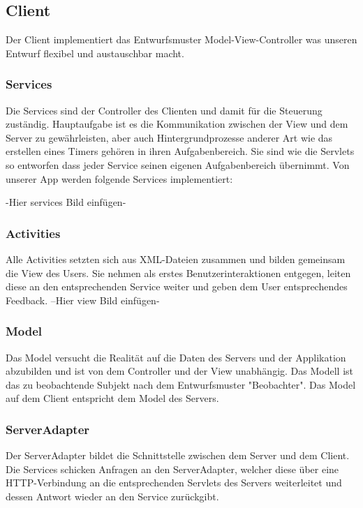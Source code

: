 	\subsection{Client}
	Der Client implementiert das Entwurfsmuster Model-View-Controller was unseren Entwurf flexibel und austauschbar macht.
	\subsubsection{Services}
	Die Services sind der Controller des Clienten und damit für die Steuerung zuständig. Hauptaufgabe ist es die Kommunikation zwischen der View und dem Server zu gewährleisten, aber auch Hintergrundprozesse anderer Art wie das erstellen eines Timers gehören in ihren Aufgabenbereich.
Sie sind wie die Servlets so entworfen dass jeder Service seinen eigenen Aufgabenbereich übernimmt.
Von unserer App werden folgende Services implementiert:

-Hier services Bild einfügen-

	\subsubsection{Activities}
	Alle Activities setzten sich aus XML-Dateien zusammen und bilden gemeinsam die View des Users.
Sie nehmen als erstes Benutzerinteraktionen entgegen, leiten diese an den entsprechenden Service weiter und geben dem User entsprechendes Feedback.
	--Hier view Bild einfügen-
	\subsubsection{Model}
Das Model versucht die Realität auf die Daten des Servers und der Applikation abzubilden und ist von dem Controller und der View unabhängig. Das Modell ist das zu beobachtende Subjekt nach dem Entwurfsmuster "Beobachter".
Das Model auf dem Client entspricht dem Model des Servers.
	\subsubsection{ServerAdapter}
	Der ServerAdapter bildet die Schnittstelle zwischen dem Server und dem Client. Die Services schicken Anfragen an den ServerAdapter, welcher diese über eine HTTP-Verbindung an die entsprechenden Servlets des Servers weiterleitet und dessen Antwort wieder an den Service zurückgibt.


	\newpage